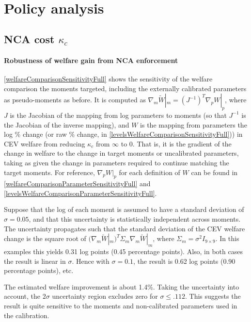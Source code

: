 \documentclass[11pt,english]{article}
\begin{document}
\section{Policy analysis}

\subsection{NCA cost $\kappa_c$}\label{appendix:policyanalysis:ncacost}

\paragraph{Robustness of welfare gain from NCA enforcement}

\autoref{welfareComparisonSensitivityFull} shows the sensitivity of the welfare comparison the moments targeted, including the externally calibrated parameters as pseudo-moments as before. It is computed as $\nabla_m \tilde{W}|_m = (J^{-1})^T \nabla_p W|_p$, where $J$ is the Jacobian of the mapping from log parameters to moments (so that $J^{-1}$ is the Jacobian of the inverse mapping), and $W$ is the mapping from parameters the log \% change (or raw \% change, in \autoref{levelsWelfareComparisonSensitivityFull})) in CEV welfare from reducing $\kappa_c$ from $\infty$ to $0$. That is, it is the gradient of the change in welfare to the change in target moments or uncalibrated parameters, taking as given the change in parameters required to continue matching the target moments. For reference, $\nabla_p W|_p$  for each definition of $W$ can be found in \autoref{welfareComparisonParameterSensitivityFull} and \autoref{levelsWelfareComparisonParameterSensitivityFull}.

Suppose that the log of each moment is assumed to have a standard deviation of $\sigma = 0.05$, and that this uncertainty is statistically independent across moments. The uncertainty propagates such that the standard deviation of the CEV welfare change is the square root of $(\nabla_m \tilde{W}|_m)^T \Sigma_m \nabla_m \tilde{W}|_m$, where $\Sigma_m = \sigma^2 I_{9\times 9}$. In this examples this yields 0.31 log points (0.45 percentage points). Also, in both cases the result is linear in $\sigma$. Hence with $\sigma = 0.1$, the result is 0.62 log points (0.90 percentage points), etc. 

The estimated welfare improvement is about 1.4\%. Taking the uncertainty into account, the $2\sigma$ uncertainty region excludes zero for $\sigma \le .112$. This suggests the result is quite sensitive to the moments and non-calibrated parameters used in the calibration. 
\end{document}
